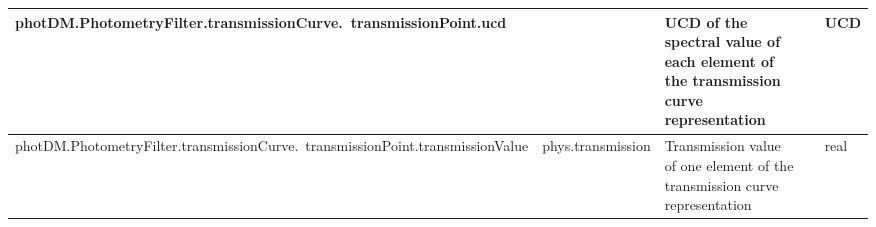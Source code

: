 \documentclass[11pt,a4paper]{ivoa}
\begin{document}
\begin{appendices}
\begin{table}[H]
\begin{adjustbox}{angle=90}
\begin{tabular}{p{2.5in}|p{1.5in}|p{2in}|p{0.74in}|p{0.35in}}
\hline
\multicolumn{1}{p{2.5in}}{{\fontsize{8pt}{8pt}
\selectfont photDM.PhotometryFilter.transmissionCurve.\ transmissionPoint.ucd}} &
\multicolumn{1}{p{1.5in}}{{\fontsize{8pt}{8pt}\selectfont }} &
\multicolumn{1}{p{2in}}{{\fontsize{8pt}{8pt}\selectfont UCD of the spectral value
of each element of the transmission curve representation}} &
\multicolumn{1}{p{0.74in}}{} &
\multicolumn{1}{p{0.35in}}{{\fontsize{8pt}{8pt}\selectfont UCD}} \\
\hline
\multicolumn{1}{p{2.5in}}{{\fontsize{8pt}{8pt}
\selectfont photDM.PhotometryFilter.transmissionCurve.\ transmissionPoint.transmissionValue}} &
\multicolumn{1}{p{1.5in}}{{\fontsize{8pt}{8pt}
\selectfont phys.transmission}} &
\multicolumn{1}{p{2in}}{{\fontsize{8pt}{8pt}\selectfont Transmission value of
one element of the transmission curve representation}} &
\multicolumn{1}{p{0.74in}}{} &
\multicolumn{1}{p{0.35in}}{{\fontsize{8pt}{8pt}\selectfont real}} \\
\hline

\end{tabular}
\end{adjustbox}
 \end{table}





\newpage



\end{appendices}
\end{document}
